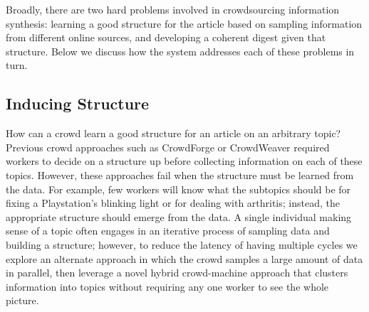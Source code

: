 Broadly, there are two hard problems involved in crowdsourcing information synthesis: learning a good structure for the article based on sampling information from different online sources, and developing a coherent digest given that structure. Below we discuss how the system addresses each of these problems in turn.



\subsection{Inducing Structure}

How can a crowd learn a good structure for an article on an arbitrary topic? Previous crowd approaches such as CrowdForge or CrowdWeaver \cite{kittur2011crowdforge, Kittur:2012:CVM:2145204.2145357} required workers to decide on a structure up before collecting information on each of these topics. However, these approaches fail when the structure must be learned from the data. For example, few workers will know what the subtopics should be for fixing a Playstation’s blinking light or for dealing with arthritis; instead, the appropriate structure should emerge from the data. A single individual making sense of a topic often engages in an iterative process of sampling data and building a structure; however, to reduce the latency of having multiple cycles we explore an alternate approach in which the crowd samples a large amount of data in parallel, then leverage a novel hybrid crowd-machine approach that clusters information into topics without requiring any one worker to see the whole picture.




